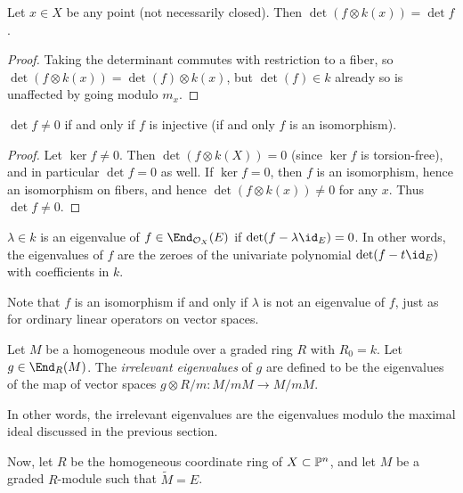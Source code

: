 \documentclass[12pt]{article}
\let\l\lambda
\let\wtilde\widetilde
\def\O{\mathcal O}
\numberwithin{equation}{section}
\theoremstyle{theorem}
\numberwithin{thm}{section}
\theoremstyle{definition}
\begin{document}
\begin{lem}
Let $x \in X$ be any point (not necessarily closed). Then $\det(f\otimes k(x)) =\det f$.
\end{lem}

\begin{proof}
Taking the determinant commutes with restriction to a fiber, so $\det(f\otimes k(x)) =\det(f)\otimes k(x)$, but $\det(f)\in k$ already so is unaffected by going modulo $m_x$.
\end{proof}



\begin{lem}
$\det f \neq 0 $ if and only if $f$ is injective (if and only $f$ is an isomorphism).
\end{lem}

\begin{proof}
  Let $\ker f \neq 0$. %
 Then $\det(f\otimes k(X))= 0$ (since $\ker f$ is torsion-free), and in particular  $\det f = 0$ as well.
If $\ker f = 0$, then
$f$ is an isomorphism, hence an isomorphism on fibers, and hence
$\det(f\otimes k(x)) \neq 0$ for any $x$. Thus $\det f\neq 0$.
\end{proof}

\begin{dfn}
$\l \in k$ is an eigenvalue of $f \in \End_{\O_X}(E)$ if $\det(f-\l \id_E)= 0$. In other words, the eigenvalues of $f$ are the zeroes of the univariate polynomial $\det(f-t\id _E)$ with coefficients in $k$.
\end{dfn}

Note that $f$ is an isomorphism if and only if $\l$ is not an eigenvalue of $f$, just as for ordinary linear operators on vector spaces.

\begin{dfn}
Let $M$ be a homogeneous module over a graded ring $R$ with $R_0=k$.
Let $g \in \End_R(M)$. The \emph{irrelevant eigenvalues} of $g$ are defined to be the eigenvalues of the map of vector spaces $g\otimes R/m:M/mM \to M/mM$.
\end{dfn}

In other words, the irrelevant eigenvalues are the eigenvalues modulo the maximal ideal discussed in the previous section.


Now, let $R$ be the homogeneous coordinate ring of $X\subset \P^n$, and let $M$ be a graded $R$-module such that $\wtilde M=E$.
\end{document}
